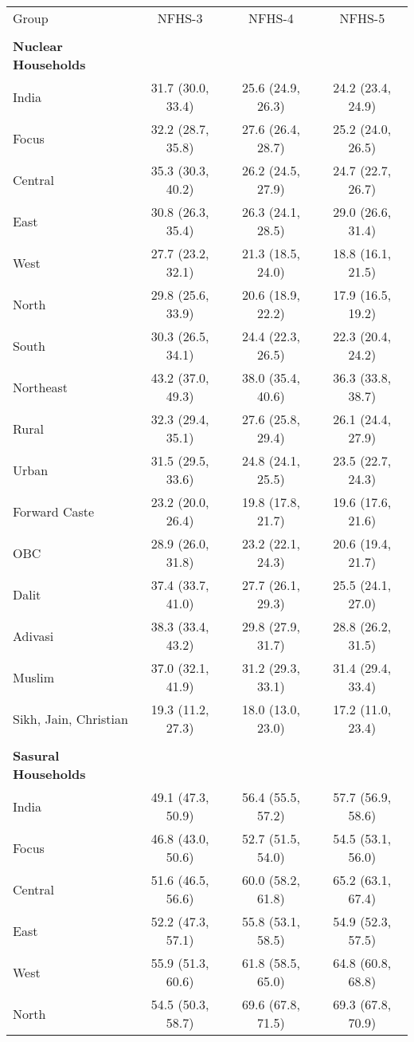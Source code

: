 \begin{tabular}{lccc}
\toprule
Group & NFHS-3 & NFHS-4 & NFHS-5 \\\\
\midrule
\textbf{Nuclear Households}&&&\\
India&31.7 (30.0, 33.4)&25.6 (24.9, 26.3)&24.2 (23.4, 24.9)\\
Focus&32.2 (28.7, 35.8)&27.6 (26.4, 28.7)&25.2 (24.0, 26.5)\\
Central&35.3 (30.3, 40.2)&26.2 (24.5, 27.9)&24.7 (22.7, 26.7)\\
East&30.8 (26.3, 35.4)&26.3 (24.1, 28.5)&29.0 (26.6, 31.4)\\
West&27.7 (23.2, 32.1)&21.3 (18.5, 24.0)&18.8 (16.1, 21.5)\\
North&29.8 (25.6, 33.9)&20.6 (18.9, 22.2)&17.9 (16.5, 19.2)\\
South&30.3 (26.5, 34.1)&24.4 (22.3, 26.5)&22.3 (20.4, 24.2)\\
Northeast&43.2 (37.0, 49.3)&38.0 (35.4, 40.6)&36.3 (33.8, 38.7)\\
Rural&32.3 (29.4, 35.1)&27.6 (25.8, 29.4)&26.1 (24.4, 27.9)\\
Urban&31.5 (29.5, 33.6)&24.8 (24.1, 25.5)&23.5 (22.7, 24.3)\\
Forward Caste&23.2 (20.0, 26.4)&19.8 (17.8, 21.7)&19.6 (17.6, 21.6)\\
OBC&28.9 (26.0, 31.8)&23.2 (22.1, 24.3)&20.6 (19.4, 21.7)\\
Dalit&37.4 (33.7, 41.0)&27.7 (26.1, 29.3)&25.5 (24.1, 27.0)\\
Adivasi&38.3 (33.4, 43.2)&29.8 (27.9, 31.7)&28.8 (26.2, 31.5)\\
Muslim&37.0 (32.1, 41.9)&31.2 (29.3, 33.1)&31.4 (29.4, 33.4)\\
Sikh, Jain, Christian&19.3 (11.2, 27.3)&18.0 (13.0, 23.0)&17.2 (11.0, 23.4)\\
&&&\\
\textbf{Sasural Households}&&&\\
India&49.1 (47.3, 50.9)&56.4 (55.5, 57.2)&57.7 (56.9, 58.6)\\
Focus&46.8 (43.0, 50.6)&52.7 (51.5, 54.0)&54.5 (53.1, 56.0)\\
Central&51.6 (46.5, 56.6)&60.0 (58.2, 61.8)&65.2 (63.1, 67.4)\\
East&52.2 (47.3, 57.1)&55.8 (53.1, 58.5)&54.9 (52.3, 57.5)\\
West&55.9 (51.3, 60.6)&61.8 (58.5, 65.0)&64.8 (60.8, 68.8)\\
North&54.5 (50.3, 58.7)&69.6 (67.8, 71.5)&69.3 (67.8, 70.9)\\

\end{tabular}
